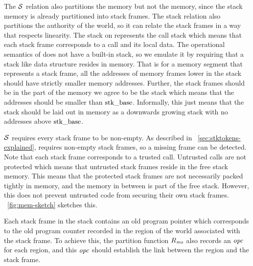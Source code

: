 \begin{jversion}
The $\lrstk[]$ relation also partitions the \trgcm{} memory but not the \srccm{} memory, since the \srccm{} stack memory is already partitioned into stack frames.
The stack relation also partitions the authority of the world, so it can relate the stack frames in a way that respects linearity.
The stack on \srccm{} represents the call stack which means that each stack frame corresponds to a call and its local data.
The operational semantics of \trgcm{} does not have a built-in stack, so we emulate it by requiring that a stack like data structure resides in \trgcm{} memory.
That is for a memory segment that represents a stack frame, all the addresses of memory frames lower in the stack should have strictly smaller memory addresses.
Further, the stack frames should be in the part of the memory we agree to be the stack which means that the addresses should be smaller than $\stkb$.
Informally, this just means that the stack should be laid out in memory as a downwards growing stack with no addresses above $\stkb$.

$\lrstk[]$ requires every stack frame to be non-empty.
As described in \sectionname~\ref{sec:stktokens-explained}, \stktokens{} requires non-empty stack frames, so a missing frame can be detected.
Note that each stack frame corresponds to a trusted call.
Untrusted calls are not protected which means that untrusted stack frames reside in the free stack memory.
This means that the protected stack frames are not necessarily packed tightly in memory, and the memory in between is part of the free stack.
However, this does not prevent untrusted code from securing their own stack frames.
\figurename~\ref{fig:mem-sketch} sketches this.

Each stack frame in the \srccm{} stack contains an old program pointer which corresponds to the old program counter recorded in the region of the world associated with the stack frame.
To achieve this, the partition function $R_\ms$ also records an $\opc$ for each region, and this $\opc$ should establish the link between the region and the stack frame.
\begin{figure}
  \centering
\end{figure}
\end{jversion}
